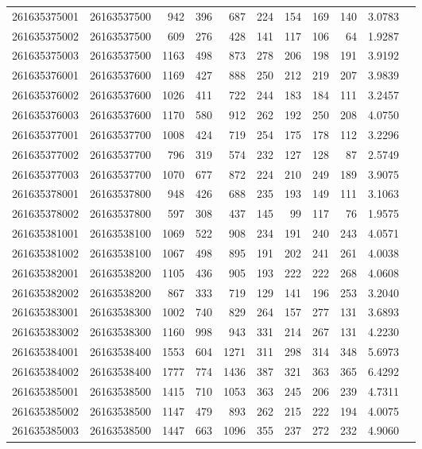 \documentclass[11pt,landscape]{article}
\begin{document}
{\begin{longtable}[]{@{}lrrrrrrrrrr@{}}
261635375001 & 26163537500 & 942 & 396 & 687 & 224 & 154 & 169 & 140 & 3.0783 \\
261635375002 & 26163537500 & 609 & 276 & 428 & 141 & 117 & 106 & 64 & 1.9287 \\
261635375003 & 26163537500 & 1163 & 498 & 873 & 278 & 206 & 198 & 191 & 3.9192 \\
261635376001 & 26163537600 & 1169 & 427 & 888 & 250 & 212 & 219 & 207 & 3.9839 \\
261635376002 & 26163537600 & 1026 & 411 & 722 & 244 & 183 & 184 & 111 & 3.2457 \\
261635376003 & 26163537600 & 1170 & 580 & 912 & 262 & 192 & 250 & 208 & 4.0750 \\
261635377001 & 26163537700 & 1008 & 424 & 719 & 254 & 175 & 178 & 112 & 3.2296 \\
261635377002 & 26163537700 & 796 & 319 & 574 & 232 & 127 & 128 & 87 & 2.5749 \\
261635377003 & 26163537700 & 1070 & 677 & 872 & 224 & 210 & 249 & 189 & 3.9075 \\
261635378001 & 26163537800 & 948 & 426 & 688 & 235 & 193 & 149 & 111 & 3.1063 \\
261635378002 & 26163537800 & 597 & 308 & 437 & 145 & 99 & 117 & 76 & 1.9575 \\
261635381001 & 26163538100 & 1069 & 522 & 908 & 234 & 191 & 240 & 243 & 4.0571 \\
261635381002 & 26163538100 & 1067 & 498 & 895 & 191 & 202 & 241 & 261 & 4.0038 \\
261635382001 & 26163538200 & 1105 & 436 & 905 & 193 & 222 & 222 & 268 & 4.0608 \\
261635382002 & 26163538200 & 867 & 333 & 719 & 129 & 141 & 196 & 253 & 3.2040 \\
261635383001 & 26163538300 & 1002 & 740 & 829 & 264 & 157 & 277 & 131 & 3.6893 \\
261635383002 & 26163538300 & 1160 & 998 & 943 & 331 & 214 & 267 & 131 & 4.2230 \\
261635384001 & 26163538400 & 1553 & 604 & 1271 & 311 & 298 & 314 & 348 & 5.6973 \\
261635384002 & 26163538400 & 1777 & 774 & 1436 & 387 & 321 & 363 & 365 & 6.4292 \\
261635385001 & 26163538500 & 1415 & 710 & 1053 & 363 & 245 & 206 & 239 & 4.7311 \\
261635385002 & 26163538500 & 1147 & 479 & 893 & 262 & 215 & 222 & 194 & 4.0075 \\
261635385003 & 26163538500 & 1447 & 663 & 1096 & 355 & 237 & 272 & 232 & 4.9060 \\

\end{longtable}}
\end{document}
